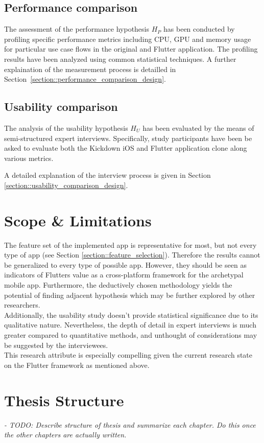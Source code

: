 \subsection{Performance comparison}
The assessment of the performance hypothesis $H_P$ has been conducted by profiling specific performance metrics including CPU, GPU and memory usage 
for particular use case flows in the original and Flutter application. 
The profiling results have been analyzed using common statistical techniques.
A further explaination of the measurement process is detailled in Section~\ref{section::performance_comparison_design}.

\subsection{Usability comparison}
The analysis of the usability hypothesis $H_U$ has been evaluated by the means of semi-structured expert interviews.
Specifically, study participants have been be asked to evaluate both the Kickdown iOS and Flutter application clone along various metrics.

A detailed explanation of the interview process is given in Section \ref{section::usability_comparison_design}.

\section{Scope \& Limitations}
The feature set of the implemented app is representative for most, but not every type of app (see Section \ref{section::feature_selection}). 
Therefore the results cannot be generalized to every type of possible app. 
However, they should be seen as indicators of Flutters value as a cross-platform framework for the 
archetypal mobile app. 
Furthermore, the deductively chosen methodology yields the potential of finding adjacent hypothesis which may be
further explored by other researchers.\\
Additionally, the usability study doesn't provide statistical significance due to its qualitative nature. Nevertheless, the depth of detail
in expert interviews is much greater compared to quantitative methods, and unthought of considerations may be suggested by the interviewees.\\
This research attribute is especially compelling given the current research state on the Flutter framework as mentioned above. 

\section{Thesis Structure}
\textit{- TODO: Describe structure of thesis and summarize each chapter. Do this once the other chapters are actually written.}
